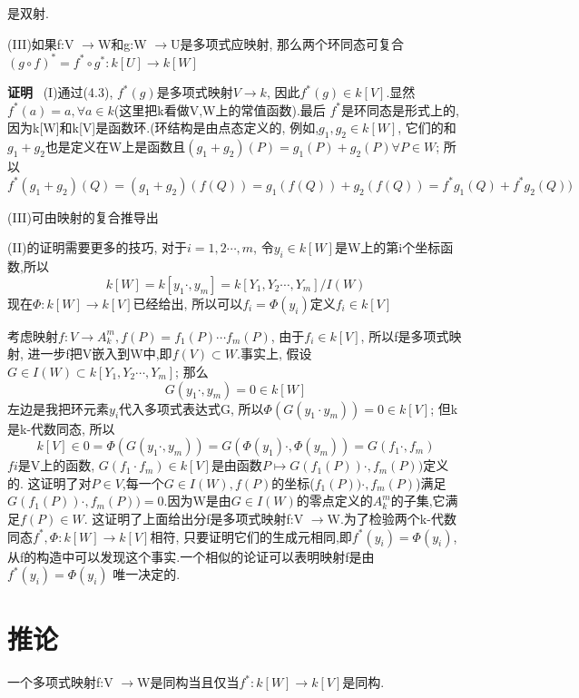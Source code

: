 \documentclass[UTF8]{book}
\begin{document}
		\justifying


		是双射.

		(III)如果f:V $\rightarrow $W和g:W $\rightarrow $U是多项式应映射, 那么两个环同态可复合$(g\circ f)^{*}=f^{*}\circ g^{*}:k[U]\rightarrow k[W]$

		\textbf{证明} \ (I)通过(4.3), $f^{*}(g)$是多项式映射$V\rightarrow k$, 因此$f^{*}(g)\in k[V]$.显然 $f^{*}(a)=a, \forall a\in k$(这里把k看做V,W上的常值函数).最后 $f^{*}$是环同态是形式上的, 因为k[W]和k[V]是函数环.(环结构是由点态定义的, 例如,$g_{1},g_{2}\in k[W]$, 它们的和 $g_{1}+g_{2}$也是定义在W上是函数且$(g_{1}+g_{2})(P)=g_{1}(P)+g_{2}(P) \forall P\in W$; 所以$f^{*}(g_{1}+g_{2})(Q)=(g_{1}+g_{2})(f(Q))= g_{1}(f(Q))+g_{2}(f(Q))= f^{*}g_{1}(Q)+f^{*}g_{2}(Q))$

		(III)可由映射的复合推导出

		(II)的证明需要更多的技巧, 对于$i=1,2\cdots,m$, 令$y_{i}\in k[W]$是W上的第i个坐标函数,所以
		\begin{equation*}
		k[W]=k[y_{1}  \cdot, y_{m}]=k[Y_{1},Y_{2} \cdots,Y_{m}]/I(W)
		\end{equation*}
		现在$\Phi:k[W]\rightarrow k[V]$已经给出, 所以可以$f_{i}=\Phi(y_{i})$定义$f_{i}\in k[V]$

		考虑映射$f:V \rightarrow A^{m}_{k}, f(P)=f_{1}(P)\cdots f_{m}(P)$, 由于$f_{i}\in k[V]$, 所以f是多项式映射, 进一步f把V嵌入到W中,即$f(V)\subset W$.事实上, 假设$G\in I(W)\subset k[Y_{1},Y_{2}\cdots,Y_{m}]$; 那么
		\begin{equation*}
		G(y_{1}\cdot ,y_{m})=0\in k[W]
		\end{equation*}
		左边是我把环元素$y_{i}$代入多项式表达式G, 所以$\Phi(G(y_{1}\cdot y_{m}))=0\in k[V]$; 但k是k-代数同态, 所以
		\begin{equation*}
		k[V]\in0=\Phi(G(y_{1}\cdot, y_{m}))=G(\Phi(y_{1})\cdot ,\Phi(y_{m}))=G(f_{1}\cdot ,f_{m})
		\end{equation*}
		$f{i}$是V上的函数, $G(f_{1}\cdot f_{m})\in k[V]$是由函数$P\mapsto G(f_{1}(P))\cdot ,f_{m}(P))$定义的. 这证明了对$P\in V$,每一个$G\in I(W),f(P)$的坐标($f_{1}(P))\cdot ,f_{m}(P)$)满足$G(f_{1}(P))\cdot ,f_{m}(P))=0$.因为W是由$G\in I(W)$的零点定义的$A^{m}_{k}$的子集,它满足$f(P)\in W$. 这证明了上面给出分f是多项式映射f:V $\rightarrow $W.为了检验两个k-代数同态$f^{*},\Phi:k[W]\rightarrow k[V]$相符, 只要证明它们的生成元相同,即$f^{*}(y_{i})=\Phi(y_{i})$,从f的构造中可以发现这个事实.一个相似的论证可以表明映射f是由$f^{*}(y_{i})=\Phi(y_{i})$  唯一决定的.
	\section{推论}一个多项式映射f:V $\rightarrow $W是同构当且仅当$f^{*}:k[W]\rightarrow k[V]$是同构.
\end{document}
